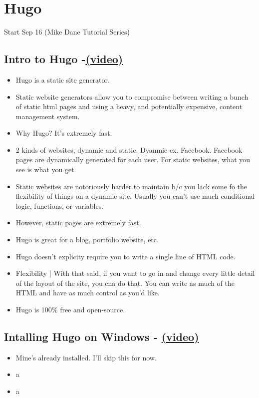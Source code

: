 \section{Hugo}

Start Sep 16 (Mike Dane Tutorial Series)

\subsection{Intro to Hugo -\href{https://youtu.be/qtIqKaDlqXo}{(video)} }
\begin{itemize}
\item
	Hugo is a static site generator.
\item
	Static website generators allow you to compromise between writing a bunch of static html pages and using a heavy, and potentially expensive, content management system.
\item
	Why Hugo? It's extremely fast.
\item
	2 kinds of websites, dynamic and static. Dyanmic ex. Facebook. Facebook pages are dynamically generated for each user. For static websites, what you see is what you get.
\item
	Static websites are notoriously harder to maintain b/c you lack some fo the flexibility of things  on a dynamic site. Usually you can't use much conditional logic, functions, or variables.
\item
	However, static pages are extremely fast.
\item
	Hugo is great for a blog, portfolio website, etc.
\item
	Hugo doesn't explicity require you to write a single line of HTML code.
\item
	Flexibility | With that said, if you want to go in and change every little detail of the layout of the site, you cna do that. You can write as much of the HTML and have as much control as you'd like.
\item
	Hugo is 100\% free and open-source.
\end{itemize}

\subsection{Intalling Hugo on Windows - \href{https://youtu.be/G7umPCU-8xc?list=PLLAZ4kZ9dFpOnyRlyS-liKL5ReHDcj4G3}{(video)} }
\begin{itemize}
\item
	Mine's already installed. I'll skip this for now.
\item
	a
\item
	a
\end{itemize}

